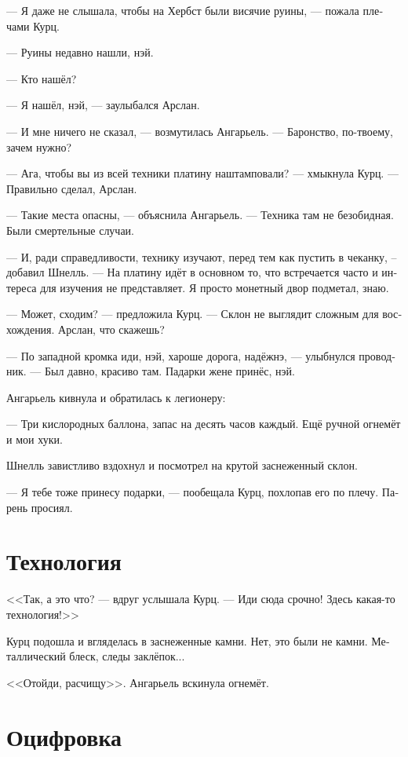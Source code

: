 \documentclass[a4paper,12pt,fleqn]{book}\usepackage{polyglossia}\setdefaultlanguage[babelshorthands=true]{russian}\setotherlanguage{english}\defaultfontfeatures{Ligatures=TeX,Mapping=tex-text}\usepackage{xcolor}\newcommand{\ml}[3]{#2}
\begin{document}
--- Я даже не слышала, чтобы на Хербст были висячие руины, --- пожала плечами Курц.

--- Руины недавно нашли, нэй.

--- Кто нашёл?

--- Я нашёл, нэй, --- заулыбался Арслан.

--- И мне ничего не сказал, --- возмутилась Ангарьель.
--- Баронство, по-твоему, зачем нужно?

--- Ага, чтобы вы из всей техники платину наштамповали? --- хмыкнула Курц.
--- Правильно сделал, Арслан.

--- Такие места опасны, --- объяснила Ангарьель.
--- Техника там не безобидная.
Были смертельные случаи.

--- И, ради справедливости, технику изучают, перед тем как пустить в чеканку, -- добавил Шнелль.
--- На платину идёт в основном то, что встречается часто и интереса для изучения не представляет.
Я просто монетный двор подметал, знаю.

--- Может, сходим? --- предложила Курц.
--- Склон не выглядит сложным для восхождения.
Арслан, что скажешь?

--- По западной кромка иди, нэй, хароше дорога, надёжнэ, --- улыбнулся проводник.
--- Был давно, красиво там.
Падарки жене принёс, нэй.

Ангарьель кивнула и обратилась к легионеру:

--- Три кислородных баллона, запас на десять часов каждый.
Ещё ручной огнемёт и мои хуки.

Шнелль завистливо вздохнул и посмотрел на крутой заснеженный склон.

--- Я тебе тоже принесу подарки, --- пообещала Курц, похлопав его по плечу.
Парень просиял.

\section{Технология}

<<Так, а это что? --- вдруг услышала Курц.
--- Иди сюда срочно!
Здесь какая-то технология!>>

Курц подошла и вгляделась в заснеженные камни.
Нет, это были не камни.
Металлический блеск, следы заклёпок...

<<Отойди, расчищу>>.
Ангарьель вскинула огнемёт.

\section{Оцифровка}
\end{document}
